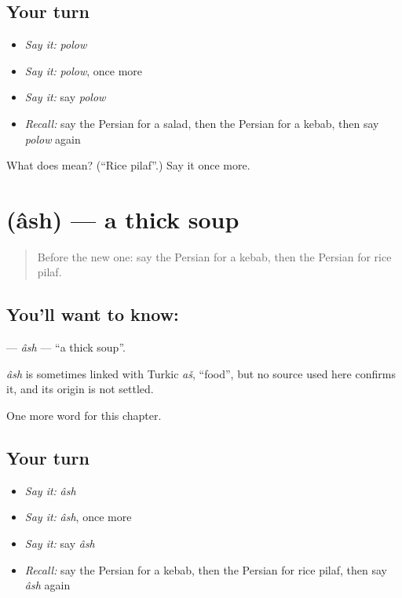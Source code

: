 \subsection*{Your turn}
\begin{itemize}
\raggedright
  \item \emph{Say it:} \emph{polow}
  \item \emph{Say it:} \emph{polow}, once more
  \item \emph{Say it:} say \emph{polow}
  \item \emph{Recall:} say the Persian for a salad, then the Persian for a kebab, then say \emph{polow} again
\end{itemize}

\begin{tcolorbox}[breakable,colback=teal!4,colframe=teal!35!black,title={Before you move on}]
What does  mean? (\textquotedblleft{}Rice pilaf\textquotedblright{}.) Say it once more.
\end{tcolorbox}
\section[\texorpdfstring{\fa{آش} (âsh)}{آش (âsh)}]{ (âsh) — a thick soup}

\label{lesson:FA-C99-ash}



\begin{quote}
Before the new one: say the Persian for a kebab, then the Persian for rice pilaf.
\end{quote}

\subsection*{You'll want to know: }
\textbf{} — \emph{âsh} — \textquotedblleft{}a thick soup\textquotedblright{}.

\begin{cousinweb}
\emph{âsh} is sometimes linked with Turkic \emph{aš}, \textquotedblleft{}food\textquotedblright{}, but no source used here confirms it, and its origin is not settled.
\end{cousinweb}

\begin{grammarlens}[title={What you've built}]
One more word for this chapter.
\end{grammarlens}

\subsection*{Your turn}
\begin{itemize}
\raggedright
  \item \emph{Say it:} \emph{âsh}
  \item \emph{Say it:} \emph{âsh}, once more
  \item \emph{Say it:} say \emph{âsh}
  \item \emph{Recall:} say the Persian for a kebab, then the Persian for rice pilaf, then say \emph{âsh} again
\end{itemize}

